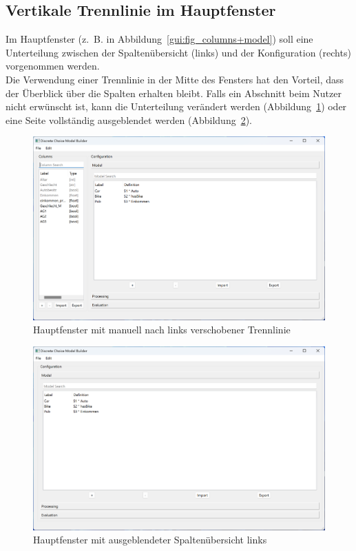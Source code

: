 \documentclass{article}
\begin{document}
\subsection{Vertikale Trennlinie im Hauptfenster}
Im Hauptfenster (z.~B. in Abbildung~\ref{gui:fig_columns+model}) soll eine Unterteilung zwischen der Spaltenübersicht (links) und der Konfiguration (rechts) vorgenommen werden.\\

Die Verwendung einer Trennlinie in der Mitte des Fensters hat den Vorteil, dass der Überblick über die Spalten erhalten bleibt. Falls ein Abschnitt beim Nutzer nicht erwünscht ist, kann die Unterteilung verändert werden (Abbildung~\ref{gui:fig_splitter1}) oder eine Seite vollständig ausgeblendet werden (Abbildung~\ref{gui:fig_splitter2}).\\

\begin{figure}[H]%
  \centering
  \includegraphics[width=12cm]{specifications/img/gui-screenshots/splitter1.png}
  \caption{Hauptfenster mit manuell nach links verschobener Trennlinie}
  \label{gui:fig_splitter1}
\end{figure}

\begin{figure}[H]%
  \centering
  \includegraphics[width=12cm]{specifications/img/gui-screenshots/model.png}
  \caption{Hauptfenster mit ausgeblendeter Spaltenübersicht links}
  \label{gui:fig_splitter2}
\end{figure}
\end{document}
